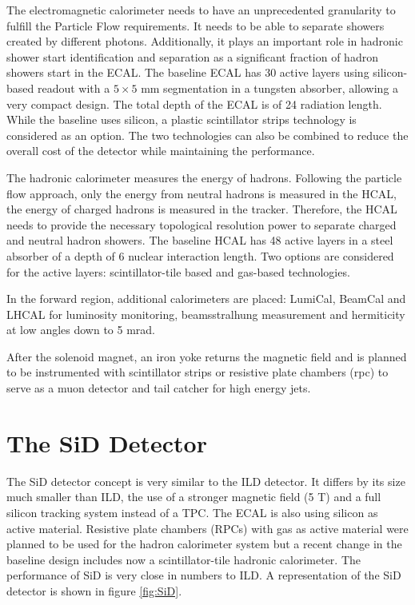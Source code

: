 The electromagnetic calorimeter needs to have an unprecedented granularity to fulfill the Particle Flow requirements. It needs to be able to separate showers created by different photons. Additionally, it plays an important role in hadronic shower start identification and separation as a significant fraction of hadron showers start in the ECAL. The baseline ECAL has 30 active layers using silicon-bas\-ed readout with a $5 \times 5$ mm segmentation in a tungsten absorber, allowing a very compact design. The total depth of the ECAL is of 24 radiation length. While the baseline uses silicon, a plastic scintillator strips technology is considered as an option. The two technologies can also be combined to reduce the overall cost of the detector while maintaining the performance.

The hadronic calorimeter measures the energy of hadrons. Following the particle flow approach, only the energy from neutral hadrons is measured in the HCAL, the energy of charged hadrons is measured in the tracker. Therefore, the HCAL needs to provide the necessary topological resolution power to separate charged and neutral hadron showers. The baseline HCAL has 48 active layers in a steel absorber of a depth of 6 nuclear interaction length. Two options are considered for the active layers: scintillator-tile based and gas-based technologies.

In the forward region, additional calorimeters are placed: LumiCal, BeamCal and LHCAL for luminosity monitoring, beamsstralhung measurement and hermiticity at low angles down to 5 mrad.

After the solenoid magnet, an iron yoke returns the magnetic field and is planned to be instrumented with scintillator strips or resistive plate chambers (\acrshort{rpc}) to serve as a muon detector and tail catcher for high energy jets.

\section{The SiD Detector}

The SiD detector concept is very similar to the ILD detector. It differs by its size much smaller than ILD, the use of a stronger magnetic field (5 T) and a full silicon tracking system instead of a TPC. The ECAL is also using silicon as active material. Resistive plate chambers (RPCs) with gas as active material were planned to be used for the hadron calorimeter system but a recent change in the baseline design includes now a scintillator-tile hadronic calorimeter. The performance of SiD is very close in numbers to ILD. A representation of the SiD detector is shown in figure \ref{fig:SiD}.

